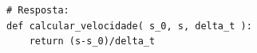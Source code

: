 \ifmostrarGabarito
\begin{verbatim}
# Resposta:
def calcular_velocidade( s_0, s, delta_t ):
    return (s-s_0)/delta_t
\end{verbatim}
\fi
